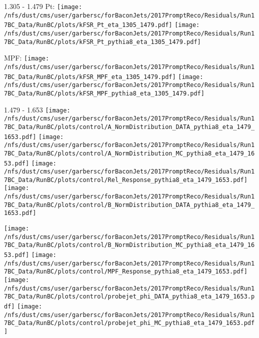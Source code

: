\documentclass[t,compress]{beamer}
\begin{document}
\begin{frame}{1.305 - 1.479}
	 Pt: \texttt{[image: /nfs/dust/cms/user/garbersc/forBaconJets/2017PromptReco/Residuals/Run17BC\_Data/RunBC/plots/kFSR\_Pt\_eta\_1305\_1479.pdf]}
	\texttt{[image: /nfs/dust/cms/user/garbersc/forBaconJets/2017PromptReco/Residuals/Run17BC\_Data/RunBC/plots/kFSR\_Pt\_pythia8\_eta\_1305\_1479.pdf]}
\newline

	 MPF: \texttt{[image: /nfs/dust/cms/user/garbersc/forBaconJets/2017PromptReco/Residuals/Run17BC\_Data/RunBC/plots/kFSR\_MPF\_eta\_1305\_1479.pdf]}
	\texttt{[image: /nfs/dust/cms/user/garbersc/forBaconJets/2017PromptReco/Residuals/Run17BC\_Data/RunBC/plots/kFSR\_MPF\_pythia8\_eta\_1305\_1479.pdf]}
\end{frame}

\begin{frame}{1.479 - 1.653}
	\texttt{[image: /nfs/dust/cms/user/garbersc/forBaconJets/2017PromptReco/Residuals/Run17BC\_Data/RunBC/plots/control/A\_NormDistribution\_DATA\_pythia8\_eta\_1479\_1653.pdf]}
	\texttt{[image: /nfs/dust/cms/user/garbersc/forBaconJets/2017PromptReco/Residuals/Run17BC\_Data/RunBC/plots/control/A\_NormDistribution\_MC\_pythia8\_eta\_1479\_1653.pdf]}
	\texttt{[image: /nfs/dust/cms/user/garbersc/forBaconJets/2017PromptReco/Residuals/Run17BC\_Data/RunBC/plots/control/Rel\_Response\_pythia8\_eta\_1479\_1653.pdf]}
	\texttt{[image: /nfs/dust/cms/user/garbersc/forBaconJets/2017PromptReco/Residuals/Run17BC\_Data/RunBC/plots/control/B\_NormDistribution\_DATA\_pythia8\_eta\_1479\_1653.pdf]}
\newline

	\texttt{[image: /nfs/dust/cms/user/garbersc/forBaconJets/2017PromptReco/Residuals/Run17BC\_Data/RunBC/plots/control/B\_NormDistribution\_MC\_pythia8\_eta\_1479\_1653.pdf]}
	\texttt{[image: /nfs/dust/cms/user/garbersc/forBaconJets/2017PromptReco/Residuals/Run17BC\_Data/RunBC/plots/control/MPF\_Response\_pythia8\_eta\_1479\_1653.pdf]}
	\texttt{[image: /nfs/dust/cms/user/garbersc/forBaconJets/2017PromptReco/Residuals/Run17BC\_Data/RunBC/plots/control/probejet\_phi\_DATA\_pythia8\_eta\_1479\_1653.pdf]}
	\texttt{[image: /nfs/dust/cms/user/garbersc/forBaconJets/2017PromptReco/Residuals/Run17BC\_Data/RunBC/plots/control/probejet\_phi\_MC\_pythia8\_eta\_1479\_1653.pdf]}
\end{frame}
\end{document}
